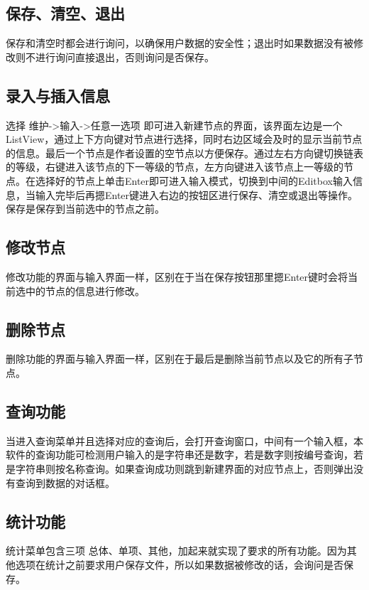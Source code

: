 \documentclass[10pt,a4paper]{article}
\begin{document}
\subsection{保存、清空、退出}
保存和清空时都会进行询问，以确保用户数据的安全性；退出时如果数据没有被修改则不进行询问直接退出，否则询问是否保存。
\subsection{录入与插入信息}
选择 维护->输入->任意一选项 即可进入新建节点的界面，该界面左边是一个ListView，通过上下方向键对节点进行选择，同时右边区域会及时的显示当前节点的信息。最后一个节点是作者设置的空节点以方便保存。通过左右方向键切换链表的等级，右键进入该节点的下一等级的节点，左方向键进入该节点上一等级的节点。在选择好的节点上单击Enter即可进入输入模式，切换到中间的Editbox输入信息，当输入完毕后再摁Enter键进入右边的按钮区进行保存、清空或退出等操作。保存是保存到当前选中的节点之前。
\subsection{修改节点}
修改功能的界面与输入界面一样，区别在于当在保存按钮那里摁Enter键时会将当前选中的节点的信息进行修改。
\subsection{删除节点}
删除功能的界面与输入界面一样，区别在于最后是删除当前节点以及它的所有子节点。
\subsection{查询功能}
当进入查询菜单并且选择对应的查询后，会打开查询窗口，中间有一个输入框，本软件的查询功能可检测用户输入的是字符串还是数字，若是数字则按编号查询，若是字符串则按名称查询。如果查询成功则跳到新建界面的对应节点上，否则弹出没有查询到数据的对话框。
\subsection{统计功能}
统计菜单包含三项 总体、单项、其他，加起来就实现了要求的所有功能。因为其他选项在统计之前要求用户保存文件，所以如果数据被修改的话，会询问是否保存。
\end{document}
